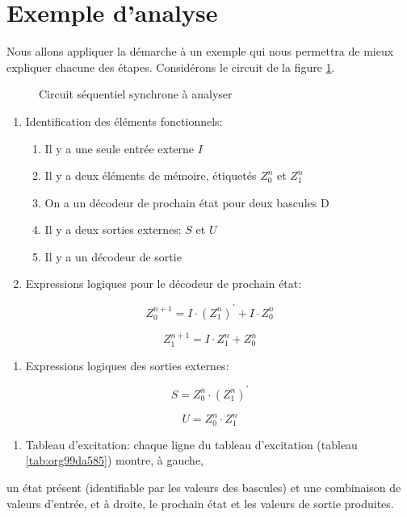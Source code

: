 \documentclass[letter, oneside]{book}
\begin{document}
\section{Exemple d'analyse}
\label{sec:orgbf4c3b2}

Nous allons appliquer la démarche à un exemple qui nous permettra de
mieux expliquer chacune des étapes. Considérons le circuit de la
figure \ref{fig:orgfc9ac4b}.

\begin{figure}[htbp]
\centering

\caption{\label{fig:orgfc9ac4b}Circuit séquentiel synchrone à analyser}
\end{figure}

\begin{enumerate}
\item Identification des éléments fonctionnels:

\begin{enumerate}
\item Il y a une seule entrée externe \(I\)
\item Il y a deux éléments de mémoire, étiquetés \(Z_0^n\) et  \(Z_1^n\)
\item On a un décodeur de prochain état pour deux bascules D
\item Il y a deux sorties externes: \(S\) et \(U\)
\item Il y a un décodeur de sortie
\end{enumerate}

\item Expressions logiques pour le décodeur de prochain état:
\end{enumerate}
$$ Z_0^{n+1} = I \cdot (Z_1^n)^\prime  + I \cdot Z_0^n $$

$$ Z_1^{n+1} = I \cdot Z_1^n +  Z_0^n  $$

\begin{enumerate}
\item Expressions logiques des sorties externes:
\end{enumerate}
$$ S =  Z_0^n \cdot (Z_1^{n})^\prime $$

$$ U =  Z_0^n \cdot Z_1^{n} $$

\begin{enumerate}
\item Tableau d'excitation: chaque ligne du tableau d'excitation (tableau \ref{tab:org99da585}) montre, à gauche,
\end{enumerate}
un état présent (identifiable par les valeurs des bascules) et une
combinaison de valeurs d'entrée, et à droite, le prochain état et les
valeurs de sortie produites.
\end{document}
